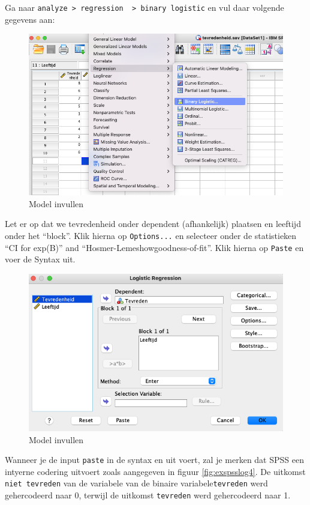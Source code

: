 \documentclass[
]{book}
\theoremstyle{definition}
\theoremstyle{definition}
\theoremstyle{definition}
\theoremstyle{definition}
\theoremstyle{remark}
\begin{document}
Ga naar \texttt{analyze\ \textgreater{}\ regression\ \ \textgreater{}\ binary\ logistic} en vul daar volgende gegevens aan:

\begin{figure}
\includegraphics[width=1\linewidth]{img/ex_spss_log_2} \caption{Model invullen}\label{fig:exspsslog2}
\end{figure}

Let er op dat we tevredenheid onder dependent (afhankelijk) plaatsen en leeftijd onder het ``block''. Klik hierna op \texttt{Options...} en selecteer onder de statistieken ``CI for exp(B)'' and ``Hosmer-Lemeshowgoodness-of-fit''. Klik hierna op \texttt{Paste} en voer de Syntax uit.

\begin{figure}
\includegraphics[width=1\linewidth]{img/ex_spss_log_3} \caption{Model invullen}\label{fig:exspsslog3}
\end{figure}

Wanneer je de input \texttt{paste} in de syntax en uit voert, zal je merken dat {SPSS} een intyerne codering uitvoert zoals aangegeven in figuur \ref{fig:exspsslog4}. De uitkomst \texttt{niet\ tevreden} van de variabele van de binaire variabele\texttt{tevreden} werd gehercodeerd naar 0, terwijl de uitkomst \texttt{tevreden} werd gehercodeerd naar 1.
\end{document}
